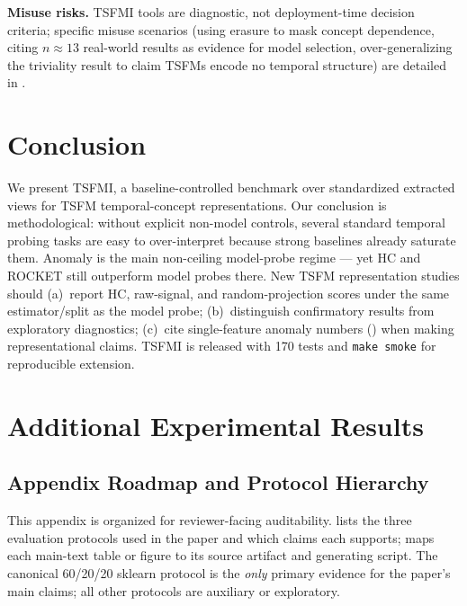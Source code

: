\documentclass{article}
\begin{document}
\textbf{Misuse risks.} TSFMI tools are diagnostic, not deployment-time decision criteria; specific misuse scenarios (using erasure to mask concept dependence, citing $n \approx 13$ real-world results as evidence for model selection, over-generalizing the triviality result to claim TSFMs encode no temporal structure) are detailed in .

\section{Conclusion}

We present TSFMI, a baseline-controlled benchmark over standardized extracted views for TSFM temporal-concept representations. Our conclusion is methodological: without explicit non-model controls, several standard temporal probing tasks are easy to over-interpret because strong baselines already saturate them. Anomaly is the main non-ceiling model-probe regime --- yet HC and ROCKET still outperform model probes there. New TSFM representation studies should (a)~report HC, raw-signal, and random-projection scores under the same estimator/split as the model probe; (b)~distinguish confirmatory results from exploratory diagnostics; (c)~cite single-feature anomaly numbers () when making representational claims. TSFMI is released with 170 tests and \texttt{make smoke} for reproducible extension.




\newpage
\appendix
\section{Additional Experimental Results}

\subsection{Appendix Roadmap and Protocol Hierarchy}
\label{sec:appendix_roadmap}

This appendix is organized for reviewer-facing auditability.  lists the three evaluation protocols used in the paper and which claims each supports;  maps each main-text table or figure to its source artifact and generating script. The canonical 60/20/20 sklearn protocol is the \emph{only} primary evidence for the paper's main claims; all other protocols are auxiliary or exploratory.
\end{document}
